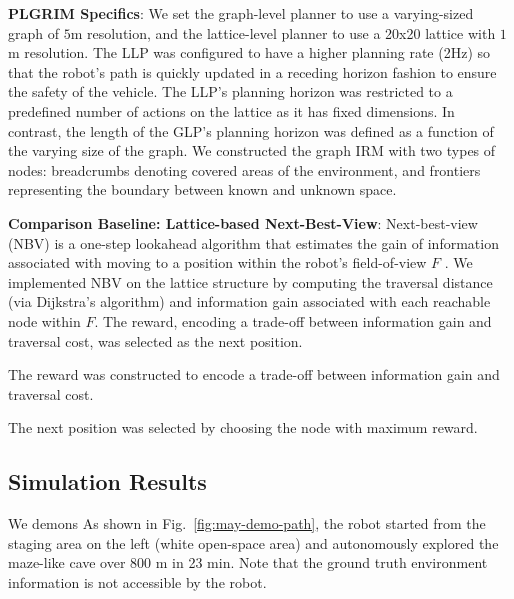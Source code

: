 \documentclass[letterpaper]{article} %
\newcommand{\ph}[1]{{\textbf{#1}:}} %
\begin{document}
\ph{PLGRIM Specifics}
We set the graph-level planner to use a varying-sized graph of $5$m resolution, and the lattice-level planner to use a 20x20 lattice with $1$m resolution.  The LLP was configured to have a higher planning rate (2Hz) so that the robot's path is quickly updated in a receding horizon fashion to ensure the safety of the vehicle. The LLP's planning horizon was restricted to a predefined number of actions on the lattice as it has fixed dimensions.  In contrast, the length of the GLP's planning horizon was defined as a function of the varying size of the graph. We constructed the graph IRM with two types of nodes: breadcrumbs denoting covered areas of the environment, and frontiers representing the boundary between known and unknown space.  

\ph{Comparison Baseline: Lattice-based Next-Best-View}
Next-best-view (NBV) is a one-step lookahead algorithm that estimates the gain of information associated with moving to a position within the robot's field-of-view $F$ \cite{bircher2016receding}. We implemented NBV on the lattice structure by computing the traversal distance (via Dijkstra's algorithm) and information gain associated with each reachable node within $F$. The reward, encoding a trade-off between information gain and traversal cost, was selected as the next position. 

The reward was constructed to encode a trade-off between information gain and traversal cost.

The next position was selected by choosing the node with maximum reward. 


\subsection{Simulation Results}

We demons
As shown in Fig.~\ref{fig:may-demo-path}, the robot started from the staging area on the left (white open-space area) and autonomously explored the maze-like cave over 800 m in 23 min.
Note that the ground truth environment information is not accessible by the robot.
\end{document}

